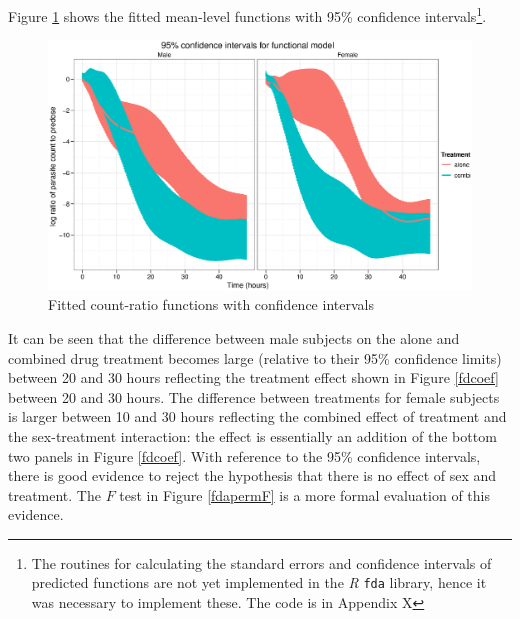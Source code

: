 Figure \ref{fdfitted} shows the fitted mean-level functions with 95\% confidence intervals\footnote{The routines for calculating the standard errors and confidence intervals of predicted functions are not yet implemented in the \emph{R} \texttt{fda} library, hence it was necessary to implement these. The code is in Appendix X}.
\begin{figure}[p]
\includegraphics[width=150mm]{lprr2i.eps} 
\caption{Fitted count-ratio functions with confidence intervals}
\label{fdfitted}
\end{figure}
It can be seen that the difference between male subjects on the alone and combined drug treatment becomes large (relative to their 95\% confidence limits) between 20 and 30 hours reflecting the treatment effect shown in Figure \ref{fdcoef} between 20 and 30 hours. The difference between treatments for female subjects is larger between 10 and 30 hours reflecting the combined effect of treatment and the sex-treatment interaction: the effect is essentially an addition of the bottom two panels in Figure \ref{fdcoef}. With reference to the 95\% confidence intervals, there is good evidence to reject the hypothesis that there is no effect of sex and treatment. The $F$ test in Figure \ref{fdapermF} is a more formal evaluation of this evidence.

